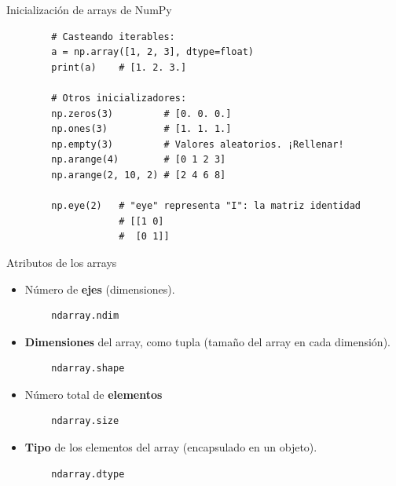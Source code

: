 \documentclass[10pt]{beamer} %
\begin{document}
\begin{frame}[fragile]{Inicialización de arrays de NumPy}
    \begin{verbatim}
        # Casteando iterables:
        a = np.array([1, 2, 3], dtype=float)
        print(a)    # [1. 2. 3.]
        
        # Otros inicializadores:
        np.zeros(3)         # [0. 0. 0.]
        np.ones(3)          # [1. 1. 1.]
        np.empty(3)         # Valores aleatorios. ¡Rellenar!
        np.arange(4)        # [0 1 2 3]
        np.arange(2, 10, 2) # [2 4 6 8]
        
        np.eye(2)   # "eye" representa "I": la matriz identidad
                    # [[1 0]
                    #  [0 1]]
    \end{verbatim}
\end{frame}

\begin{frame}[fragile]{Atributos de los arrays}
    \begin{itemize}
        \item Número de \textbf{ejes} (dimensiones).
    \end{itemize}
    \begin{verbatim}
        ndarray.ndim
    \end{verbatim}
    \begin{itemize}
        \item \textbf{Dimensiones} del array, como tupla (tamaño del array en cada dimensión).
    \end{itemize}
    \begin{verbatim}
        ndarray.shape
    \end{verbatim}
    \begin{itemize}
        \item Número total de \textbf{elementos}
    \end{itemize}
    \begin{verbatim}
        ndarray.size
    \end{verbatim}
    \begin{itemize}
        \item \textbf{Tipo} de los elementos del array (encapsulado en un objeto).
    \end{itemize}
    \begin{verbatim}
        ndarray.dtype
    \end{verbatim}
\end{frame}
\end{document}
